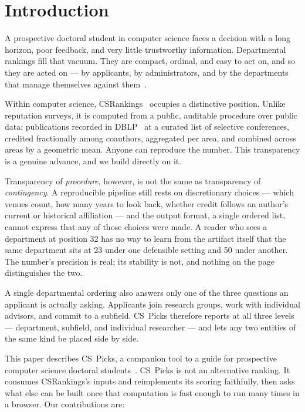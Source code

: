 \documentclass[11pt]{article}
\newcommand{\sys}{CS~Picks}
\newcommand{\csr}{CSRankings}
\begin{document}
\section{Introduction}
\label{sec:intro}

A prospective doctoral student in computer science faces a decision with a long
horizon, poor feedback, and very little trustworthy information. Departmental
rankings fill that vacuum. They are compact, ordinal, and easy to act on, and
so they are acted on --- by applicants, by administrators, and by the
departments that manage themselves against
them~\cite{usnews,espeland2016engines}.

Within computer science, \csr{}~\cite{csrankings} occupies a distinctive
position. Unlike reputation surveys, it is computed from a public, auditable
procedure over public data: publications recorded in DBLP~\cite{dblp} at a
curated list of selective conferences, credited fractionally among coauthors,
aggregated per area, and combined across areas by a geometric mean. Anyone can
reproduce the number. This transparency is a genuine advance, and we build
directly on it.

Transparency of \emph{procedure}, however, is not the same as transparency of
\emph{contingency}. A reproducible pipeline still rests on discretionary
choices --- which venues count, how many years to look back, whether credit
follows an author's current or historical affiliation --- and the output
format, a single ordered list, cannot express that any of those choices were
made. A reader who sees a department at position 32 has no way to learn from
the artifact itself that the same department sits at 23 under one defensible
setting and 50 under another. The number's precision is real; its stability is
not, and nothing on the page distinguishes the two.

A single departmental ordering also answers only one of the three questions an
applicant is actually asking. Applicants join research groups, work with
individual advisors, and commit to a subfield. \sys{} therefore reports at all
three levels --- department, subfield, and individual researcher --- and lets
any two entities of the same kind be placed side by side.

This paper describes \sys{}, a companion tool to a guide for prospective
computer science doctoral students~\cite{phddemystify}. \sys{} is not an
alternative ranking. It consumes \csr{}'s inputs and reimplements its scoring
faithfully, then asks what else can be built once that computation is fast
enough to run many times in a browser. Our contributions are:
\end{document}

